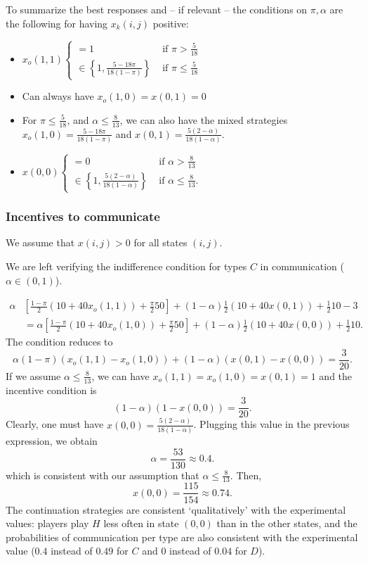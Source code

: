 \documentclass[12pt]{article}
\begin{document}
To summarize the best responses and -- if relevant -- the conditions on $\pi,\alpha$ are the following for having $x_k(i,j)$ positive:

\begin{itemize}\setlength\itemsep{0em}
	\item $x_o(1,1)\begin{cases}
		=1 &\text{ if } \pi >\frac{5}{18}\\
		\in\left\{1,\frac{5-18\pi}{18(1-\pi)}\right\}&\text{ if } \pi \leq \frac{5}{18}
	\end{cases}$
	\item Can always have $x_o(1,0)=x(0,1)=0$
	\item For $\pi\leq \frac{5}{18}$, and $\alpha\leq \frac{8}{13}$, we can also have the mixed strategies $x_o(1,0)=\frac{5-18\pi}{18(1-\pi)}$ and $x(0,1)=\frac{5(2-\alpha)}{18(1-\alpha)}$.
	\item $x(0,0)\begin{cases}
		=0 &\text{ if } \alpha >\frac{8}{13}\\
		\in\left\{1,\frac{5(2-\alpha)}{18(1-\alpha)}\right\}&\text{ if } \alpha \leq \frac{8}{13}.
	\end{cases}$
\end{itemize}

\subsubsection*{Incentives to communicate}
We assume that $x(i,j)>0$ for all states $(i,j)$.

We are left verifying the indifference condition for types $C$ in communication ($\alpha\in(0,1)$).

\begin{align*}
	\alpha&\left[\frac{1-\pi}{2}(10+40 x_o(1,1))+\frac{\pi}{2}50\right]+(1-\alpha)\frac{1}{2}(10+40x(0,1))+\frac{1}{2}10-3\\
		&=\alpha\left[\frac{1-\pi}{2}(10+40 x_o(1,0))+\frac{\pi}{2}50\right]+(1-\alpha)\frac{1}{2}(10+40x(0,0))+\frac{1}{2}10.
\end{align*}
The condition reduces to 
\begin{equation}\label{IC-comm}
	\alpha (1-\pi ) (x_o(1,1)-x_o(1,0))+(1-\alpha) (x(0,1)-x(0,0))=\frac{3}{20}.	
\end{equation}
%
If we assume $\alpha\leq \frac{8}{13}$, we can have $x_o(1,1)=x_o(1,0)=x(0,1)=1$ and the incentive condition is 
\[
(1-\alpha) (1-x(0,0))=\frac{3}{20}.
\]
Clearly, one must have $x(0,0)=\frac{5(2-\alpha)}{18(1-\alpha)}$. Plugging this value in the previous expression, we obtain 
\[
\alpha=\frac{53}{130}\approx 0.4.
\]
which is consistent with our assumption that $\alpha\leq \frac{8}{13}$. Then, 
\[
x(0,0)=\frac{115}{154}\approx 0.74.
\]
%
The continuation strategies are consistent `qualitatively' with the experimental values: players play $H$ less often in state $(0,0)$ than in the other states, and the probabilities of communication per type are also consistent with the experimental value ($0.4$ instead of $0.49$ for $C$ and $0$ instead of $0.04$ for $D$).
\end{document}
